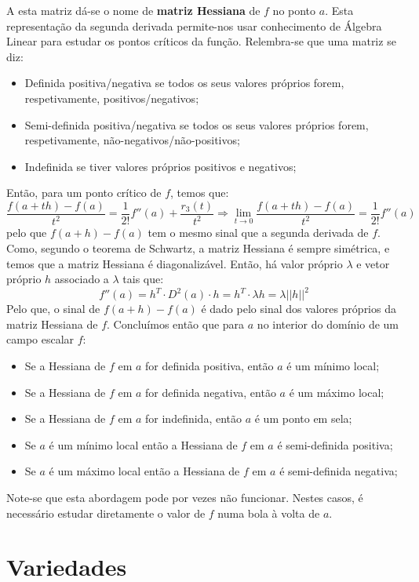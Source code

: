 \documentclass{article}
\begin{document}
A esta matriz dá-se o nome de \textbf{matriz Hessiana} de $f$ no ponto $a$. Esta representação da segunda derivada permite-nos usar conhecimento de Álgebra Linear para estudar os pontos críticos da função. Relembra-se que uma matriz se diz:
\begin{itemize}
	\item Definida positiva/negativa se todos os seus valores próprios forem, respetivamente, positivos/negativos;
	\item Semi-definida positiva/negativa se todos os seus valores próprios forem, respetivamente, não-negativos/não-positivos;
	\item Indefinida se tiver valores próprios positivos e negativos;
\end{itemize}
Então, para um ponto crítico de $f$, temos que:
$$
\frac{f(a+th)-f(a)}{t^2} = \frac{1}{2!}f''(a) + \frac{r_3(t)}{t^2} \Rightarrow \lim_{t \to 0} \frac{f(a+th)-f(a)}{t^2} = \frac{1}{2!}f''(a)
$$
pelo que $f(a+h)-f(a)$ tem o mesmo sinal que a segunda derivada de $f$. Como, segundo o teorema de Schwartz, a matriz Hessiana é sempre simétrica, e temos que a matriz Hessiana é diagonalizável. Então, há valor próprio $\lambda$ e vetor próprio $h$ associado a $\lambda$ tais que:
$$
f''(a) = h^T \cdot D^2 (a) \cdot h = h^T \cdot \lambda h = \lambda ||h||^2
$$
Pelo que, o sinal de $f(a+h)-f(a)$ é dado pelo sinal dos valores próprios da matriz Hessiana de $f$. Concluímos então que para $a$ no interior do domínio de um campo escalar $f$:
\begin{itemize}
	\item Se a Hessiana de $f$ em $a$ for definida positiva, então $a$ é um mínimo local;
	\item Se a Hessiana de $f$ em $a$ for definida negativa, então $a$ é um máximo local;
	\item Se a Hessiana de $f$ em $a$ for indefinida, então $a$ é um ponto em sela;
	\item Se $a$ é um mínimo local então a Hessiana de $f$ em $a$ é semi-definida positiva;
	\item Se $a$ é um máximo local então a Hessiana de $f$ em $a$ é semi-definida negativa;
\end{itemize}
Note-se que esta abordagem pode por vezes não funcionar. Nestes casos, é necessário estudar diretamente o valor de $f$ numa bola à volta de $a$.

\section{Variedades}
\end{document}
